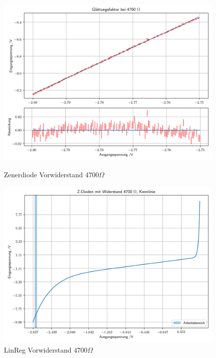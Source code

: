 \documentclass[12pt,twoside,a4paper]{scrartcl}
\begin{document}
		\begin{figure}[H]
			\centering
			\begin{minipage}{0.49 \textwidth}
					\includegraphics[width = \textwidth]{Plots/zener/diff_res_4700}
			\caption{Zenerdiode Vorwiderstand $4700 \Omega$}
			\end{minipage}
			\begin{minipage}{0.49 \textwidth}
					\includegraphics[width = \textwidth]{Plots/zener/spannungenZener_4700}
			\caption{LinReg Vorwiderstand $4700 \Omega$}
			\end{minipage}
		\end{figure}
\end{document}
